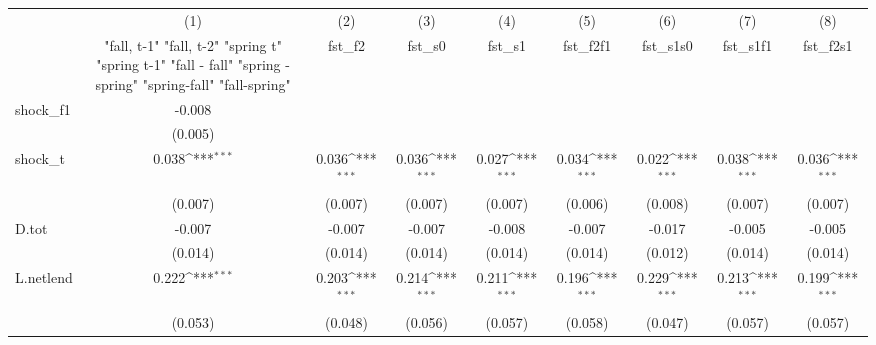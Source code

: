 {
\def\sym#1{\ifmmode^{#1}\else\(^{#1}\)\fi}
\begin{tabular}{l*{8}{c}}
\toprule
            &\multicolumn{1}{c}{(1)}&\multicolumn{1}{c}{(2)}&\multicolumn{1}{c}{(3)}&\multicolumn{1}{c}{(4)}&\multicolumn{1}{c}{(5)}&\multicolumn{1}{c}{(6)}&\multicolumn{1}{c}{(7)}&\multicolumn{1}{c}{(8)}\\
            &\multicolumn{1}{c}{  "fall, t-1" "fall, t-2" "spring t" "spring t-1"  "fall - fall" "spring - spring" "spring-fall" "fall-spring" }&\multicolumn{1}{c}{fst\_f2}&\multicolumn{1}{c}{fst\_s0}&\multicolumn{1}{c}{fst\_s1}&\multicolumn{1}{c}{fst\_f2f1}&\multicolumn{1}{c}{fst\_s1s0}&\multicolumn{1}{c}{fst\_s1f1}&\multicolumn{1}{c}{fst\_f2s1}\\
\midrule
shock\_f1    &      -0.008         &                     &                     &                     &                     &                     &                     &                     \\
            &     (0.005)         &                     &                     &                     &                     &                     &                     &                     \\
\addlinespace
shock\_t     &       0.038\sym{***}&       0.036\sym{***}&       0.036\sym{***}&       0.027\sym{***}&       0.034\sym{***}&       0.022\sym{***}&       0.038\sym{***}&       0.036\sym{***}\\
            &     (0.007)         &     (0.007)         &     (0.007)         &     (0.007)         &     (0.006)         &     (0.008)         &     (0.007)         &     (0.007)         \\
\addlinespace
D.tot       &      -0.007         &      -0.007         &      -0.007         &      -0.008         &      -0.007         &      -0.017         &      -0.005         &      -0.005         \\
            &     (0.014)         &     (0.014)         &     (0.014)         &     (0.014)         &     (0.014)         &     (0.012)         &     (0.014)         &     (0.014)         \\
\addlinespace
L.netlend   &       0.222\sym{***}&       0.203\sym{***}&       0.214\sym{***}&       0.211\sym{***}&       0.196\sym{***}&       0.229\sym{***}&       0.213\sym{***}&       0.199\sym{***}\\
            &     (0.053)         &     (0.048)         &     (0.056)         &     (0.057)         &     (0.058)         &     (0.047)         &     (0.057)         &     (0.057)         \\

\end{tabular}}
